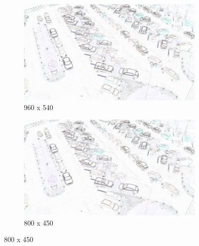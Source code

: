 \begin{figure}[H]
    \bigskip
    \begin{subfigure}{.5\textwidth}
        \centering
        \includegraphics[width=.85\linewidth]{img/conception/image_process/edge-downsample/5.png}
        \caption{960 x 540}   
    \end{subfigure}%
    \begin{subfigure}{.5\textwidth}
        \centering
        \includegraphics[width=.85\linewidth]{img/conception/image_process/edge-downsample/4.png}
        \caption{800 x 450}
    \end{subfigure}%


\end{figure}

